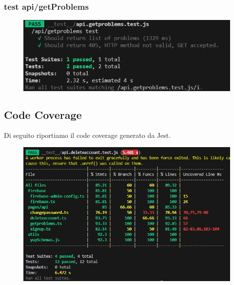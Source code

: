 \documentclass[11pt, a4paper]{article}
\theoremstyle{definition}
\begin{document}
\subsubsection{test api/getProblems}

\begin{figure}[H]
  \centering
  \includegraphics[width = \textwidth]{materiale/testing/GetProblems.png}
\end{figure}

\newpage
\subsection{Code Coverage}
Di seguito riportiamo il code coverage generato da Jest.
\begin{figure}[H]
  \centering
  \includegraphics[scale = 1]{materiale/testing/Code Coverage.png}
\end{figure}
\end{document}
